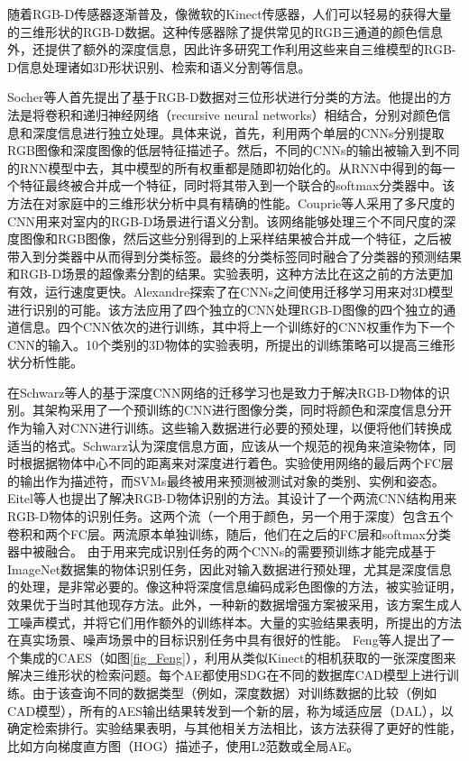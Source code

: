 \documentclass[twoside,UTF8]{nputhesis}
\begin{document}
随着RGB-D传感器逐渐普及，像微软的Kinect传感器，人们可以轻易的获得大量的三维形状的RGB-D数据。这种传感器除了提供常见的RGB三通道的颜色信息外，还提供了额外的深度信息，因此许多研究工作利用这些来自三维模型的RGB-D信息处理诸如3D形状识别、检索和语义分割等信息\cite{Sanchez2016A}。

Socher等人\cite{Socher2012Convolutional}首先提出了基于RGB-D数据对三位形状进行分类的方法。他提出的方法是将卷积和递归神经网络（recursive neural networks）相结合，分别对颜色信息和深度信息进行独立处理。具体来说，首先，利用两个单层的CNNs分别提取RGB图像和深度图像的低层特征描述子。然后，不同的CNNs的输出被输入到不同的RNN模型中去，其中模型的所有权重都是随即初始化的。从RNN中得到的每一个特征最终被合并成一个特征，同时将其带入到一个联合的softmax分类器中。该方法在对家庭中的三维形状分析中具有精确的性能。Couprie等人\cite{Couprie2013Indoor}采用了多尺度的CNN用来对室内的RGB-D场景进行语义分割。该网络能够处理三个不同尺度的深度图像和RGB图像，然后这些分别得到的上采样结果被合并成一个特征，之后被带入到分类器中从而得到分类标签。最终的分类标签同时融合了分类器的预测结果和RGB-D场景的超像素分割的结果。实验表明，这种方法比在这之前的方法更加有效，运行速度更快。Alexandre\cite{Alexandre20123D}探索了在CNNs之间使用迁移学习用来对3D模型进行识别的可能。该方法应用了四个独立的CNN处理RGB-D图像的四个独立的通道信息。四个CNN依次的进行训练，其中将上一个训练好的CNN权重作为下一个CNN的输入。10个类别的3D物体的实验表明，所提出的训练策略可以提高三维形状分析性能。

在Schwarz等人\cite{Schwarz2015RGB}的基于深度CNN网络的迁移学习也是致力于解决RGB-D物体的识别。其架构采用了一个预训练的CNN进行图像分类，同时将颜色和深度信息分开作为输入对CNN进行训练。这些输入数据进行必要的预处理，以便将他们转换成适当的格式。Schwarz认为深度信息方面，应该从一个规范的视角来渲染物体，同时根据据物体中心不同的距离来对深度进行着色。实验使用网络的最后两个FC层的输出作为描述符，而SVMs最终被用来预测被测试对象的类别、实例和姿态。Eitel等人\cite{Eitel2015Multimodal}也提出了解决RGB-D物体识别的方法。其设计了一个两流CNN结构用来RGB-D物体的识别任务。这两个流（一个用于颜色，另一个用于深度）包含五个卷积和两个FC层。两流原本单独训练，随后，他们在之后的FC层和softmax分类器中被融合。 由于用来完成识别任务的两个CNNs的需要预训练才能完成基于ImageNet数据集的物体识别任务，因此对输入数据进行预处理，尤其是深度信息的处理，是非常必要的。像这种将深度信息编码成彩色图像的方法，被实验证明，效果优于当时其他现存方法。此外，一种新的数据增强方案被采用，该方案生成人工噪声模式，并将它们用作额外的训练样本。大量的实验结果表明，所提出的方法在真实场景、噪声场景中的目标识别任务中具有很好的性能。 Feng等人\cite{Feng20163D}提出了一个集成的CAES（如图\ref{fig_Feng}），利用从类似Kinect的相机获取的一张深度图来解决三维形状的检索问题。每个AE都使用SDG在不同的数据库CAD模型上进行训练。由于该查询不同的数据类型（例如，深度数据）对训练数据的比较（例如CAD模型），所有的AES输出结果转发到一个新的层，称为域适应层（DAL），以确定检索排行。实验结果表明，与其他相关方法相比，该方法获得了更好的性能，比如方向梯度直方图（HOG）描述子，使用L2范数或全局AE。 
\end{document}
